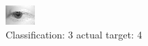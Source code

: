 \begin{figure}[h!]
\begin{center}
\includegraphics[width=0.60\columnwidth]{figures/ID2570_class_3_target_4.png}
\end{center}
\caption{ Classification: 3 actual target: 4}
\label{fig:ID2570_class_3_target_4}
\end{figure}
